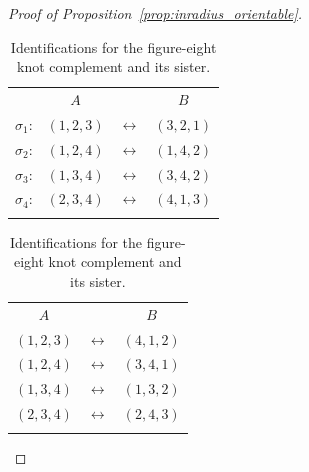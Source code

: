 \documentclass[11pt,reqno]{amsart}
\theoremstyle{definition}
\numberwithin{equation}{section}
\numberwithin{equation}{section}
\begin{document}
\begin{proof}[Proof of Proposition~\ref{prop:inradius_orientable}]
\begin{table}[hbp]
\parbox{.48\linewidth}{
\centering
\begin{tabular}{rccc} 
 & $A$ & & $B$ \\
$\sigma_1$: & $(1,2,3)$ & $\leftrightarrow$ & $(3,2,1)$ \\
$\sigma_2$: & $(1,2,4)$ & $\leftrightarrow$ & $(1,4,2)$ \\
$\sigma_3$: & $(1,3,4)$ & $\leftrightarrow$ & $(3,4,2)$ \\
$\sigma_4$: & $(2,3,4)$ & $\leftrightarrow$ & $(4,1,3)$ \\
 & & & 
\end{tabular}
}
\parbox{.48\linewidth}{
\centering
\begin{tabular}{ccc} 
$A$ & & $B$ \\
$(1,2,3)$ & $\leftrightarrow$ & $(4,1,2)$ \\
$(1,2,4)$ & $\leftrightarrow$ & $(3,4,1)$ \\
$(1,3,4)$ & $\leftrightarrow$ & $(1,3,2)$ \\
$(2,3,4)$ & $\leftrightarrow$ & $(2,4,3)$ \\
& &
\end{tabular}
}
\caption{Identifications for the figure-eight knot complement and its sister.}  \label{table:8}
\end{table}



\end{proof}
\end{document}
